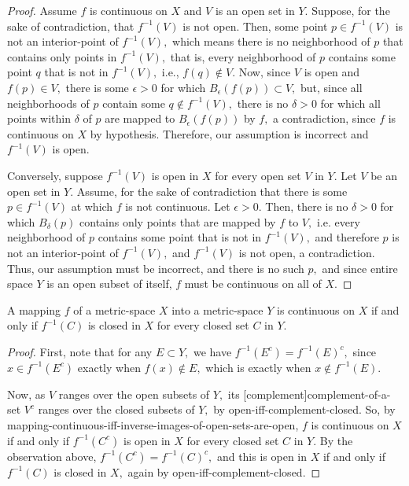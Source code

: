 \documentclass{article}
\begin{document}
\begin{proof}
Assume $f$ is continuous on $X$ and $V$ is an \@{open} set in $Y.$ Suppose, for the sake of contradiction, that $f^{-1}(V)$ is not open. Then, some point $p \in f^{-1}(V)$ is not an \@{interior-point} of $f^{-1}(V),$ which means there is no \@{neighborhood} of $p$ that contains only points in $f^{-1}(V),$ that is, every neighborhood of $p$ contains some point $q$ that is not in $f^{-1}(V),$ i.e., $f(q) \notin V.$ Now, since $V$ is open and $f(p) \in V,$ there is some $\epsilon > 0$ for which $B_\epsilon(f(p)) \subset V,$ but, since all neighborhoods of $p$ contain some $q \notin f^{-1}(V),$ there is no $\delta > 0$ for which all points within $\delta$ of $p$ are mapped to $B_\epsilon(f(p))$ by $f,$ a contradiction, since $f$ is continuous on $X$ by hypothesis. Therefore, our assumption is incorrect and $f^{-1}(V)$ is open.

Conversely, suppose $f^{-1}(V)$ is \@{open} in $X$ for every \@{open} set $V$ in $Y.$ Let $V$ be an \@{open} set in $Y.$ Assume, for the sake of contradiction that there is some $p \in f^{-1}(V)$ at which $f$ is not continuous. Let $\epsilon > 0.$ Then, there is no $\delta > 0$ for which $B_\delta(p)$ contains only points that are mapped by $f$ to $V,$ i.e. every \@{neighborhood} of $p$ contains some point that is not in $f^{-1}(V),$ and therefore $p$ is not an \@{interior-point} of $f^{-1}(V),$ and $f^{-1}(V)$ is not open, a contradiction. Thus, our assumption must be incorrect, and there is no such $p,$ and since entire space $Y$ is an \@{open} \@{subset} of itself, $f$ must be continuous on all of $X.$
\end{proof}

\begin{corollary}\label{mapping-continuous-iff-inverse-images-of-closed-sets-are-closed}
A \@{mapping} $f$ of a \@{metric-space} $X$ into a \@{metric-space} $Y$ is \@{continuous} on $X$ if and only if $f^{-1}(C)$ is \@{closed} in $X$ for every \@{closed} set $C$ in $Y.$
\end{corollary}

\begin{proof}
First, note that for any $E \subset Y,$ we have $f^{-1}(E^c) = f^{-1}(E)^c,$ since $x \in f^{-1}(E^c)$ exactly when $f(x) \notin E,$ which is exactly when $x \notin f^{-1}(E).$

Now, as $V$ ranges over the \@{open} \@{subsets} of $Y,$ its \@[complement]{complement-of-a-set} $V^c$ ranges over the \@{closed} subsets of $Y,$ by \@{open-iff-complement-closed}. So, by \@{mapping-continuous-iff-inverse-images-of-open-sets-are-open}, $f$ is continuous on $X$ if and only if $f^{-1}(C^c)$ is \@{open} in $X$ for every closed set $C$ in $Y.$ By the observation above, $f^{-1}(C^c) = f^{-1}(C)^c,$ and this is open in $X$ if and only if $f^{-1}(C)$ is closed in $X,$ again by \@{open-iff-complement-closed}.
\end{proof}
\end{document}
